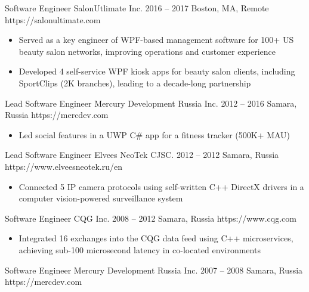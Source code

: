 \begin{paracol}{2}
    \cvLeftEvent%
        {Software Engineer}
        {SalonUtlimate Inc.}
        {2016 -- 2017}
        {Boston, MA, Remote}
        {https://salonultimate.com}

        \begin{itemize}
            \item Served as a key engineer of WPF-based management software
                  for 100+ US beauty salon networks, improving operations and customer experience
            \item Developed 4 self-service WPF kiosk apps for beauty salon clients,
                  including SportClips (2K branches), leading to a decade-long partnership
        \end{itemize}

    \cvLeftEvent%
        {Lead Software Engineer}
        {Mercury Development Russia Inc.}
        {2012 -- 2016}
        {Samara, Russia}
        {https://mercdev.com}

        \begin{itemize}
            \item Led social features in a UWP C\# app for a fitness tracker (500K+ MAU)
        \end{itemize}

    \cvLeftEvent%
        {Lead Software Engineer}
        {Elvees NeoTek CJSC.}
        {2012 -- 2012}
        {Samara, Russia}
        {https://www.elveesneotek.ru/en}

        \begin{itemize}
            \item Connected 5 IP camera protocols using self-written C++ DirectX drivers
                  in a computer vision-powered surveillance system
        \end{itemize}

    \cvLeftEvent%
        {Software Engineer}
        {CQG Inc.}
        {2008 -- 2012}
        {Samara, Russia}
        {https://www.cqg.com}

        \begin{itemize}
            \item Integrated 16 exchanges into the CQG data feed using C++ microservices,
                  achieving sub-100 microsecond latency in co-located environments
        \end{itemize}

    \cvLeftEvent%
        {Software Engineer}
        {Mercury Development Russia Inc.}
        {2007 -- 2008}
        {Samara, Russia}
        {https://mercdev.com}


\end{paracol}
